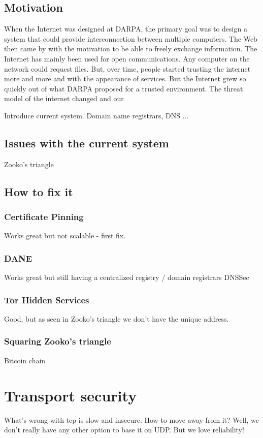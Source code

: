 \documentclass{vldb}
\begin{document}
\subsection{Motivation}
When the Internet was designed at DARPA, the primary goal was to design a system that could provide interconnection between multiple computers. The Web then came by with the motivation to be able to freely exchange information. The Internet has mainly been used for open communications. Any computer on the network could request files. But, over time, people started trusting the internet more and more and with the appearance of services. But the Internet grew so quickly out of what DARPA proposed for a trusted environment. The threat model of the internet changed and our 


Introduce current system. Domain name registrars, DNS ...

\subsection{ Issues with the current system} 
Zooko's triangle
\subsection{How to fix it}
\subsubsection{Certificate Pinning}
Works great but not scalable - first fix.
\subsubsection{DANE}
Works great but still having a centralized registry / domain registrars
DNSSec
\subsubsection{Tor Hidden Services}
Good, but as seen in Zooko's triangle we don't have the unique address.
\subsubsection{Squaring Zooko's triangle}
Bitcoin chain

\section{Transport security}
What's wrong with tcp is slow and insecure. How to move away from it? Well, we don't really have any other option to base it on UDP.
But we love reliability!
\end{document}
